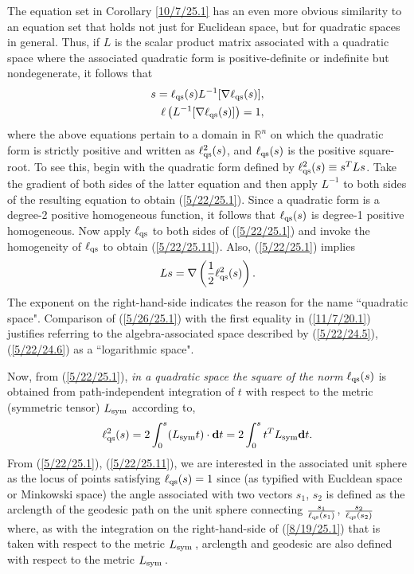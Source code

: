 \documentclass{amsart}
\theoremstyle{definition}
\numberwithin{theorem}{section}
\numberwithin{equation}{section}
\begin{document}
The equation set in Corollary \ref{10/7/25.1} has an even more obvious similarity to an equation set that holds not just for Euclidean space, but for quadratic spaces in general. 
Thus, if $L$ is the scalar product matrix associated with a quadratic space where the associated quadratic form is positive-definite or indefinite but nondegenerate, it follows that
  \begin{eqnarray}\label{5/22/25.1} s = \ell_{\rm qs}(s) L^{-1}[\nabla \ell_{\rm qs}(s)],\\ \ell\left(L^{-1}[\nabla \ell_{\rm qs}(s)]\right) = 1, \label{5/22/25.11}\end{eqnarray} where the above equations pertain to a domain in $\mathbb{R}^n$ on which the quadratic form is strictly positive and written as $\ell_{\rm qs}^2(s)$, and $\ell_{\rm qs}(s)$ is the positive square-root.  To see this, begin with the quadratic form defined by $ \ell_{\rm qs}^2(s) \equiv s^TLs$.  Take the gradient of both sides of the latter equation and then apply $L^{-1}$ to both sides of the resulting equation to obtain (\ref{5/22/25.1}).  
  Since a quadratic form is a degree-2 positive homogeneous function, it follows that $\ell_{\rm qs}(s)$ is degree-1 positive homogeneous.  Now apply $\ell_{\rm qs}$ to both sides of  (\ref{5/22/25.1}) and invoke the homogeneity of $\ell_{\rm qs}$ to obtain (\ref{5/22/25.11}).      
Also, (\ref{5/22/25.1}) implies \begin{equation}\label{5/26/25.1} Ls = \nabla\left(\frac{1}{2}\ell_{\rm qs}^2(s)\right).\end{equation}  The exponent on the right-hand-side indicates the reason for the name ``quadratic space".  Comparison of (\ref{5/26/25.1}) with the first equality in (\ref{11/7/20.1}) justifies referring to the algebra-associated space described by (\ref{5/22/24.5}), (\ref{5/22/24.6}) as a ``logarithmic space".

Now, from (\ref{5/22/25.1}), {\it in a quadratic space the square of the norm} $\ell_{\rm qs}(s)$ is obtained from path-independent integration of $t$ with respect to the metric (symmetric tensor) $L_{\rm sym}$ according to, \begin{equation}\label{8/19/25.1} \ell_{\rm qs}^2(s) = 2\int_0^s (L_{\rm sym}t)\cdot \mathbf{d}t =  2\int_0^s t^T L_{\rm sym} \mathbf{d}t.\end{equation}
From (\ref{5/22/25.1}), (\ref{5/22/25.11}), we are interested in the associated unit sphere as the locus of points satisfying $\ell_{\rm qs}(s)=1$ since (as typified with Eucldean space or Minkowski space) the angle associated with two vectors $s_1$, $s_2$ is defined as the arclength of the geodesic path on the unit sphere connecting $\frac{s_1}{\ell_{\rm qs}(s_1)}$, $\frac{s_2}{\ell_{\rm qs}(s_2)}$ where, as with the integration on the right-hand-side of (\ref{8/19/25.1}) that is taken with respect to the metric $L_{\rm sym}$\,, arclength and geodesic are also defined with respect to the metric $L_{\rm sym}$\,. 
\end{document}
